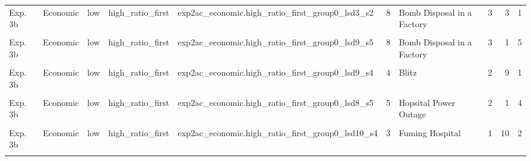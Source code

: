 \documentclass[
]{article}
\begin{document}
\begin{longtable}[t]{lllllrlrrr}
Exp. 3b & Economic & low & high\_ratio\_first & exp2ac\_economic.high\_ratio\_first\_group0\_lsd3\_s2 & 8 & Bomb Disposal in a Factory & 3 & 3 & 1\\
\addlinespace
\cellcolor{gray!10}{Exp. 3b} & \cellcolor{gray!10}{Economic} & \cellcolor{gray!10}{low} & \cellcolor{gray!10}{high\_ratio\_first} & \cellcolor{gray!10}{exp2ac\_economic.high\_ratio\_first\_group0\_lsd4\_s5} & \cellcolor{gray!10}{8} & \cellcolor{gray!10}{Bomb Disposal in a Factory} & \cellcolor{gray!10}{3} & \cellcolor{gray!10}{2} & \cellcolor{gray!10}{6}\\
Exp. 3b & Economic & low & high\_ratio\_first & exp2ac\_economic.high\_ratio\_first\_group0\_lsd9\_s5 & 8 & Bomb Disposal in a Factory & 3 & 1 & 5\\
\cellcolor{gray!10}{Exp. 3b} & \cellcolor{gray!10}{Economic} & \cellcolor{gray!10}{low} & \cellcolor{gray!10}{high\_ratio\_first} & \cellcolor{gray!10}{exp2ac\_economic.high\_ratio\_first\_group0\_lsd12\_s3} & \cellcolor{gray!10}{4} & \cellcolor{gray!10}{Blitz} & \cellcolor{gray!10}{2} & \cellcolor{gray!10}{9} & \cellcolor{gray!10}{3}\\
Exp. 3b & Economic & low & high\_ratio\_first & exp2ac\_economic.high\_ratio\_first\_group0\_lsd9\_s4 & 4 & Blitz & 2 & 9 & 1\\
\cellcolor{gray!10}{Exp. 3b} & \cellcolor{gray!10}{Economic} & \cellcolor{gray!10}{low} & \cellcolor{gray!10}{high\_ratio\_first} & \cellcolor{gray!10}{exp2ac\_economic.high\_ratio\_first\_group0\_lsd4\_s2} & \cellcolor{gray!10}{5} & \cellcolor{gray!10}{Hopsital Power Outage} & \cellcolor{gray!10}{2} & \cellcolor{gray!10}{7} & \cellcolor{gray!10}{3}\\
\addlinespace
Exp. 3b & Economic & low & high\_ratio\_first & exp2ac\_economic.high\_ratio\_first\_group0\_lsd8\_s5 & 5 & Hopsital Power Outage & 2 & 1 & 4\\
\cellcolor{gray!10}{Exp. 3b} & \cellcolor{gray!10}{Economic} & \cellcolor{gray!10}{low} & \cellcolor{gray!10}{high\_ratio\_first} & \cellcolor{gray!10}{exp2ac\_economic.high\_ratio\_first\_group0\_lsd11\_s5} & \cellcolor{gray!10}{7} & \cellcolor{gray!10}{Flooding Valleys} & \cellcolor{gray!10}{1} & \cellcolor{gray!10}{6} & \cellcolor{gray!10}{1}\\
Exp. 3b & Economic & low & high\_ratio\_first & exp2ac\_economic.high\_ratio\_first\_group0\_lsd10\_s4 & 3 & Fuming Hospital & 1 & 10 & 2\\
\cellcolor{gray!10}{Exp. 3b} & \cellcolor{gray!10}{Economic} & \cellcolor{gray!10}{low} & \cellcolor{gray!10}{high\_ratio\_first} & \cellcolor{gray!10}{exp2ac\_economic.high\_ratio\_first\_group0\_lsd3\_s3} & \cellcolor{gray!10}{9} & \cellcolor{gray!10}{Zoklid Plague} & \cellcolor{gray!10}{1} & \cellcolor{gray!10}{4} & \cellcolor{gray!10}{1}\\

\end{longtable}
\end{document}
